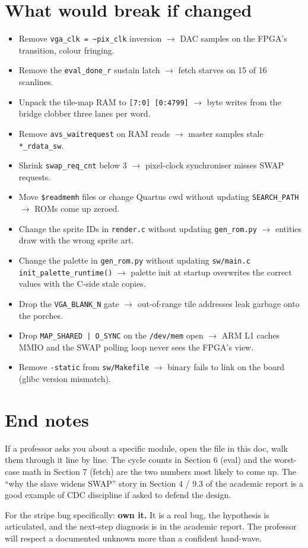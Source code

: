 \documentclass[11pt,letterpaper]{article}
\begin{document}
\section{What would break if changed}

\begin{itemize}[leftmargin=*,nosep]
  \item Remove \texttt{vga\_clk = \textasciitilde pix\_clk} inversion
    $\to$ DAC samples on the FPGA's transition, colour fringing.
  \item Remove the \texttt{eval\_done\_r} sustain latch $\to$ fetch
    starves on 15 of 16 scanlines.
  \item Unpack the tile-map RAM to \texttt{[7:0] [0:4799]} $\to$ byte
    writes from the bridge clobber three lanes per word.
  \item Remove \texttt{avs\_waitrequest} on RAM reads $\to$ master
    samples stale \texttt{*\_rdata\_sw}.
  \item Shrink \texttt{swap\_req\_cnt} below 3 $\to$ pixel-clock
    synchroniser misses SWAP requests.
  \item Move \texttt{\$readmemh} files or change Quartus cwd without
    updating \texttt{SEARCH\_PATH} $\to$ ROMs come up zeroed.
  \item Change the sprite IDs in \texttt{render.c} without updating
    \texttt{gen\_rom.py} $\to$ entities draw with the wrong sprite art.
  \item Change the palette in \texttt{gen\_rom.py} without updating
    \texttt{sw/main.c init\_palette\_runtime()} $\to$ palette init at
    startup overwrites the correct values with the C-side stale copies.
  \item Drop the \texttt{VGA\_BLANK\_N} gate $\to$ out-of-range tile
    addresses leak garbage onto the porches.
  \item Drop \texttt{MAP\_SHARED | O\_SYNC} on the \texttt{/dev/mem}
    open $\to$ ARM L1 caches MMIO and the SWAP polling loop never sees
    the FPGA's view.
  \item Remove \texttt{-static} from \texttt{sw/Makefile} $\to$ binary
    fails to link on the board (glibc version mismatch).
\end{itemize}

\section*{End notes}

If a professor asks you about a specific module, open the file in this
doc, walk them through it line by line. The cycle counts in Section 6 (eval) and
the worst-case math in Section 7 (fetch) are the two numbers most likely to come
up. The ``why the slave widens SWAP'' story in Section 4 / 9.3 of the academic
report is a good example of CDC discipline if asked to defend the design.

For the stripe bug specifically: \textbf{own it.} It is a real bug, the
hypothesis is articulated, and the next-step diagnosis is in the academic
report. The professor will respect a documented unknown more than a
confident hand-wave.
\end{document}
